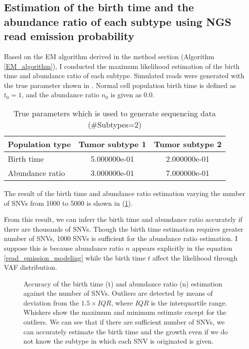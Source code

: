 \documentclass{article}
\begin{document}
\subsection{Estimation of the birth time and the abundance ratio of each subtype using NGS read emission probability}
Based on the EM algorithm derived in the method section (Algorithm \ref{EM_algorithm}), I conducted the maximum likelihood estimation of the birth time and abundance ratio of each subtype.
Simulated reads were generated with the true parameter shown in . Normal cell population birth time is defined as $t_{0}=1$, and the abundance ratio $n_{0}$ is given as 0.0.

\begin{table}[H]
\begin{center}
 \caption{True parameters which is used to generate sequencing data (\#Subtypes=2)}
 \label{tab: true_parameters_0.5_0.4_3}
  \begin{tabular}[t]{lcc}\toprule
  Population type & Tumor subtype 1 & Tumor subtype 2\\\midrule
   Birth time & 5.000000e-01 & 2.000000e-01\\
   Abundance ratio & 3.000000e-01 & 7.000000e-01\\\bottomrule
 \end{tabular}
\end{center}
\end{table}

The result of the birth time and abundance ratio estimation varying the number of SNVs from 1000 to 5000 is shown in (\ref{fig: read_emission_snv}).

From this result, we can inferr the birth time and abundance ratio accurately if there are thousands of SNVs.
Though the birth time estimation requires greater number of SNVs, 1000 SNVs is sufficient for the abundance ratio estimation.
I suppose this is because abundance ratio $n$ appears explicitly in the equation \ref{read_emission_modeling} while the birth time $t$ affect the likelihood through VAF distribution.

\begin{figure}[H]
   \caption{
 Accuracy of the birth time (t) and abundance ratio (n) estimation against the number of SNVs. Outliers are detected by means of deviation from the $1.5 \times IQR$, where $IQR$ is the interquartile range. Whiskers show the maximum and minimum estimate except for the outliers. We can see that if there are sufficient number of SNVs, we can accurately estimate the birth time and the growth even if we do not know the subtype in which each SNV is originated is given.
  }
 \label{fig: read_emission_snv}
\end{figure}
\end{document}
